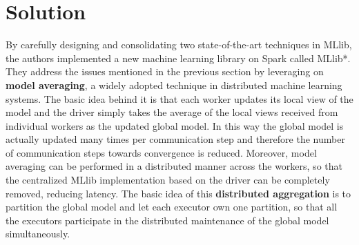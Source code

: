 \documentclass[10pt]{proc}
\begin{document}
\section{Solution}
By carefully designing and consolidating two state-of-the-art techniques in MLlib, the authors implemented a new machine learning library on Spark called MLlib*. They address the issues mentioned in the previous section by leveraging on \textbf{model averaging}, a widely adopted technique in distributed machine learning systems. The basic idea behind it is that each worker updates its local view of the model and the driver simply takes the average of the local views received from individual workers as the updated global model. In this way the global model is actually updated many times per communication step and therefore the number of communication steps towards convergence is reduced. Moreover, model averaging can be performed in a distributed manner across the workers, so that the centralized MLlib implementation based on the driver can be completely removed, reducing latency. The basic idea of this \textbf{distributed aggregation} is to partition the global model and let each
executor own one partition, so that all the executors participate in the distributed maintenance of the global model simultaneously.
\end{document}
